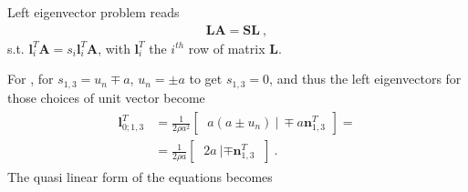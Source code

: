 \documentclass[letterpaper,10pt,english]{jupyterBook}
\begin{document}
\sphinxAtStartPar
Left eigenvector problem reads
\begin{equation*}
\begin{split}\mathbf{L} \mathbf{A} = \mathbf{S} \mathbf{L} \ ,\end{split}
\end{equation*}
\sphinxAtStartPar
s.t. \(\mathbf{l}_i^T \mathbf{A} = s_i \mathbf{l}_i^T \mathbf{A}\), with \(\mathbf{l}_i^T\) the \(i^{th}\) row of matrix \(\mathbf{L}\).

\sphinxAtStartPar
{} For , for \(s_{1,3} = u_n \mp a\), \(u_n = \pm a\) to get \(s_{1,3} = 0\), and thus the left eigenvectors for those choices of unit vector become
\begin{equation*}
\begin{split}\begin{aligned}
  \mathbf{l}_{0; 1,3}^T
  & = \frac{1}{2 \rho a^2} \begin{bmatrix} \  a ( a \pm u_n ) \ | \ \mp a \mathbf{n}^T_{1,3} \end{bmatrix} = \\
  & = \frac{1}{2 \rho a} \begin{bmatrix} \ 2 a \ | \mp \mathbf{n}^T_{1,3} \ \end{bmatrix} \ .
\end{aligned}\end{split}
\end{equation*}
\sphinxAtStartPar
The quasi linear form of the equations becomes
\end{document}
